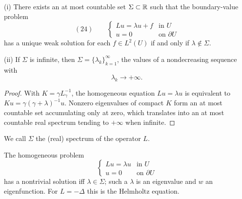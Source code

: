 \begin{theorem}
\label{thm:third-existence-spectrum}

(i) There exists an at most countable set $\Sigma \subset \mathbb{R}$ such that the boundary-value problem
$$(24) \qquad \begin{cases} Lu = \lambda u + f & \text{in } U \\ u = 0 & \text{on } \partial U \end{cases}$$
has a unique weak solution for each $f \in L^2(U)$ if and only if $\lambda \notin \Sigma$.

(ii) If $\Sigma$ is infinite, then $\Sigma = \{\lambda_k\}_{k=1}^\infty$, the values of a nondecreasing sequence with
$$\lambda_k \to +\infty.$$
\end{theorem}

\begin{proof}
\sketch With $K=\gamma L_\gamma^{-1}$, the homogeneous equation $Lu=\lambda u$ is equivalent to $Ku=\gamma(\gamma+\lambda)^{-1}u$. Nonzero eigenvalues of compact $K$ form an at most countable set accumulating only at zero, which translates into an at most countable real spectrum tending to $+\infty$ when infinite.
\end{proof}

\begin{definition}
\label{def:spectrum-of-operator}

We call $\Sigma$ the (real) spectrum of the operator $L$.
\end{definition}

\begin{remark}
\label{rem:eigenvalues-helmholtz-equation}

The homogeneous problem
$$\begin{cases} Lu = \lambda u & \text{in } U \\ u = 0 & \text{on } \partial U \end{cases}$$
has a nontrivial solution iff $\lambda\in\Sigma$; such a $\lambda$ is an eigenvalue and $w$ an eigenfunction. For $L=-\Delta$ this is the Helmholtz equation.
\end{remark}

